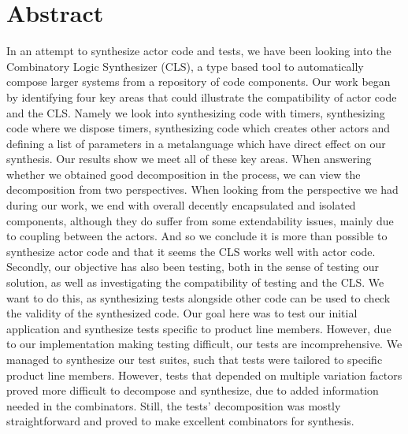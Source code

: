 \section{Abstract}
In an attempt to synthesize actor code and tests, we have been looking into the Combinatory Logic Synthesizer (CLS), a type based tool to automatically compose larger systems from a repository of code components. Our work began by identifying four key areas that could illustrate the compatibility of actor code and the CLS. Namely we look into synthesizing code with timers, synthesizing code where we dispose timers, synthesizing code which creates other actors and defining a list of parameters in a metalanguage which have direct effect on our synthesis. Our results show we meet all of these key areas. When answering whether we obtained good decomposition in the process, we can view the decomposition from two perspectives. When looking from the perspective we had during our work, we end with overall decently encapsulated and isolated components, although they do suffer from some extendability issues, mainly due to coupling between the actors. And so we conclude it is more than possible to synthesize actor code and that it seems the CLS works well with actor code.\\
Secondly, our objective has also been testing, both in the sense of testing our solution, as well as investigating the compatibility of testing and the CLS. We want to do this, as synthesizing tests alongside other code can be used to check the validity of the synthesized code. Our goal here was to test our initial application and synthesize tests specific to product line members. However, due to our implementation making testing difficult, our tests are incomprehensive. We managed to synthesize our test suites, such that tests were tailored to specific product line members. However, tests that depended on multiple variation factors proved more difficult to decompose and synthesize, due to added information needed in the combinators. Still, the tests' decomposition was mostly straightforward and proved to make excellent combinators for synthesis.

